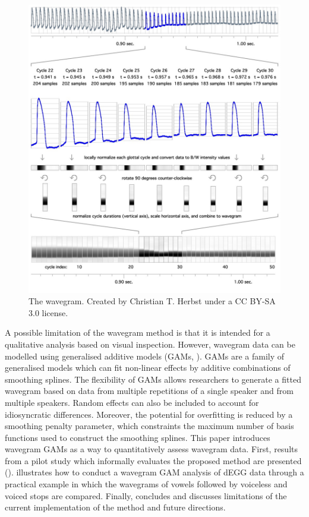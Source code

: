 \documentclass[
  11pt,
  a4paper,
]{article}
\begin{document}
\begin{figure}
  \centering
  \includegraphics{./img/wavegram.png}
  \caption{The wavegram. Created by Christian T. Herbst under a CC BY-SA 3.0 license.}
  \label{f:wavegram}
\end{figure}

A possible limitation of the wavegram method is that it is intended for
a qualitative analysis based on visual inspection. However, wavegram
data can be modelled using generalised additive models (GAMs,
\citealt{hastie1986, zuur2012, wood2017}). GAMs are a family of
generalised models which can fit non-linear effects by additive
combinations of smoothing splines. The flexibility of GAMs allows
researchers to generate a fitted wavegram based on data from multiple
repetitions of a single speaker and from multiple speakers. Random
effects can also be included to account for idiosyncratic differences.
Moreover, the potential for overfitting is reduced by a smoothing
penalty parameter, which constraints the maximum number of basis
functions used to construct the smoothing splines. This paper introduces
wavegram GAMs as a way to quantitatively assess wavegram data. First,
results from a pilot study which informally evaluates the proposed
method are presented ().  illustrates how
to conduct a wavegram GAM analysis of dEGG data through a practical
example in which the wavegrams of vowels followed by voiceless and
voiced stops are compared. Finally,  concludes and
discusses limitations of the current implementation of the method and
future directions.
\end{document}

